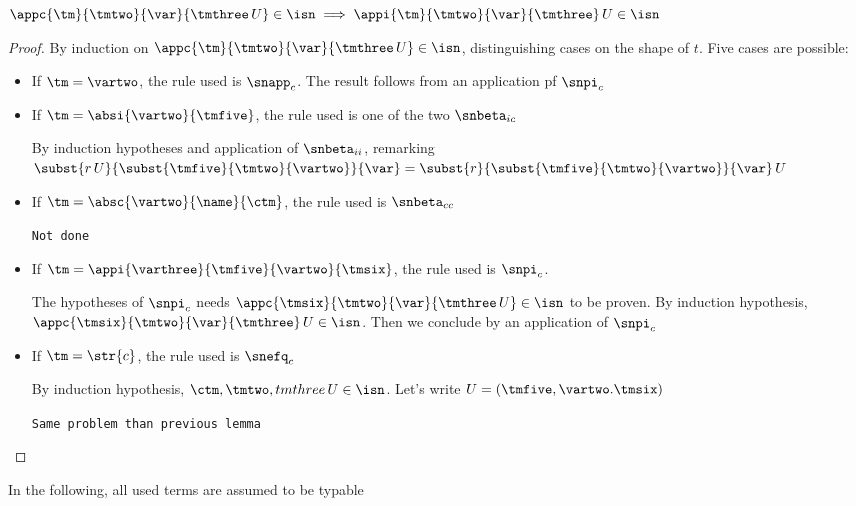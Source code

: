 \begin{lemma}\label{generalized_snpi_c}
  $\appc{\tm}{\tmtwo}{\var}{\tmthree\,U}\in\isn\implies\appi{\tm}{\tmtwo}{\var}{\tmthree}\,U\in\isn$
\end{lemma}
\begin{proof}
  By induction on $\appc{\tm}{\tmtwo}{\var}{\tmthree\,U}\in\isn$, distinguishing cases on the shape of $t$. Five cases are possible:
  \begin{itemize}
  \item If $\tm=\vartwo$, the rule used is $\snapp_c$. The result follows from an application pf $\snpi_c$
  \item If $\tm=\absi{\vartwo}{\tmfive}$, the rule used is one of the two $\snbeta_{ic}$

    By induction hypotheses and application of $\snbeta_{ii}$, remarking $\subst{r\,U}{\subst{\tmfive}{\tmtwo}{\vartwo}}{\var} = \subst{r}{\subst{\tmfive}{\tmtwo}{\vartwo}}{\var}\,U$
  \item If $\tm=\absc{\vartwo}{\name}{\ctm}$, the rule used is $\snbeta_{cc}$

    \texttt{Not done}
  \item If $\tm=\appi{\varthree}{\tmfive}{\vartwo}{\tmsix}$, the rule used is $\snpi_c$.

    The hypotheses of $\snpi_c$ needs $\appc{\tmsix}{\tmtwo}{\var}{\tmthree\,U}\in\isn$ to be proven. By induction hypothesis, $\appc{\tmsix}{\tmtwo}{\var}{\tmthree}\,U\in\isn$. Then we conclude by an application of $\snpi_c$
  \item If $\tm=\str{c}$, the rule used is $\snefq_c$

    By induction hypothesis, $\ctm, \tmtwo, tmthree\,U\in\isn$. Let's write $U=(\tmfive, \vartwo.\tmsix)$

    \texttt{Same problem than previous lemma}
  \end{itemize}
\end{proof}

In the following, all used terms are assumed to be typable

